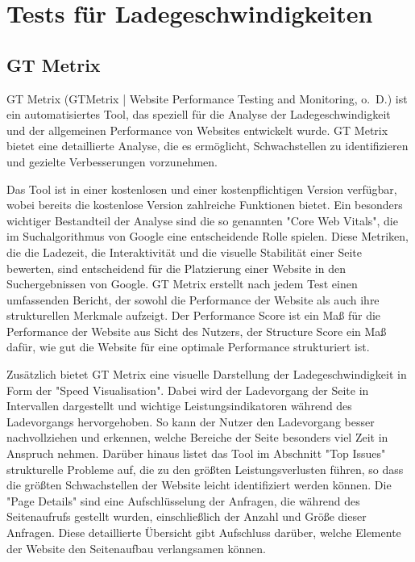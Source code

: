 \section{Tests für Ladegeschwindigkeiten}
\label{sec:test_fur_ladegeschwindigkeiten}



\subsection{GT Metrix}
\label{sec:gt_metrix}
GT Metrix (GTMetrix | Website Performance Testing and Monitoring, o. D.) ist ein automatisiertes Tool, das speziell für die Analyse der Ladegeschwindigkeit und der allgemeinen Performance von Websites entwickelt wurde. GT Metrix bietet eine detaillierte Analyse, die es ermöglicht, Schwachstellen zu identifizieren und gezielte Verbesserungen vorzunehmen.

Das Tool ist in einer kostenlosen und einer kostenpflichtigen Version verfügbar, wobei bereits die kostenlose Version zahlreiche Funktionen bietet. Ein besonders wichtiger Bestandteil der Analyse sind die so genannten "Core Web Vitals", die im Suchalgorithmus von Google eine entscheidende Rolle spielen. Diese Metriken, die die Ladezeit, die Interaktivität und die visuelle Stabilität einer Seite bewerten, sind entscheidend für die Platzierung einer Website in den Suchergebnissen von Google. GT Metrix erstellt nach jedem Test einen umfassenden Bericht, der sowohl die Performance der Website als auch ihre strukturellen Merkmale aufzeigt. Der Performance Score ist ein Maß für die Performance der Website aus Sicht des Nutzers, der Structure Score ein Maß dafür, wie gut die Website für eine optimale Performance strukturiert ist.

Zusätzlich bietet GT Metrix eine visuelle Darstellung der Ladegeschwindigkeit in Form der "Speed Visualisation". Dabei wird der Ladevorgang der Seite in Intervallen dargestellt und wichtige Leistungsindikatoren während des Ladevorgangs hervorgehoben. So kann der Nutzer den Ladevorgang besser nachvollziehen und erkennen, welche Bereiche der Seite besonders viel Zeit in Anspruch nehmen. Darüber hinaus listet das Tool im Abschnitt "Top Issues" strukturelle Probleme auf, die zu den größten Leistungsverlusten führen, so dass die größten Schwachstellen der Website leicht identifiziert werden können. Die "Page Details" sind eine Aufschlüsselung der Anfragen, die während des Seitenaufrufs gestellt wurden, einschließlich der Anzahl und Größe dieser Anfragen. Diese detaillierte Übersicht gibt Aufschluss darüber, welche Elemente der Website den Seitenaufbau verlangsamen können.

